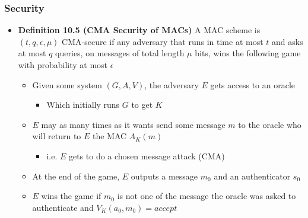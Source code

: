 \subsubsection{Security}
\begin{itemize}
  \item \textbf{Definition 10.5 (CMA Security of MACs)} A MAC scheme is $(t,q,\epsilon, \mu)$ CMA-secure if any adversary that runs in time at most $t$ and asks at most $q$ queries, on messages of total length $\mu$ bits, wins the following game with probability at most $\epsilon$
  \begin{itemize}
  	\item Given some system $(G,A,V)$, the adversary $E$ gets access to an oracle
    \begin{itemize}
  		\item Which initially runs $G$ to get $K$
    \end{itemize}
  	\item $E$ may as many times as it wants send some message $m$ to the oracle who will return to $E$ the MAC $A_K(m)$
    \begin{itemize}
  		\item i.e. $E$ gets to do a chosen message attack (CMA)
    \end{itemize}
  	\item At the end of the game, $E$ outputs a message $m_0$ and an authenticator $s_0$
  	\item $E$ wins the game if $m_0$ is not one of the message the oracle was asked to authenticate and $V_K(a_0,m_0) = accept$
  \end{itemize}
\end{itemize}

